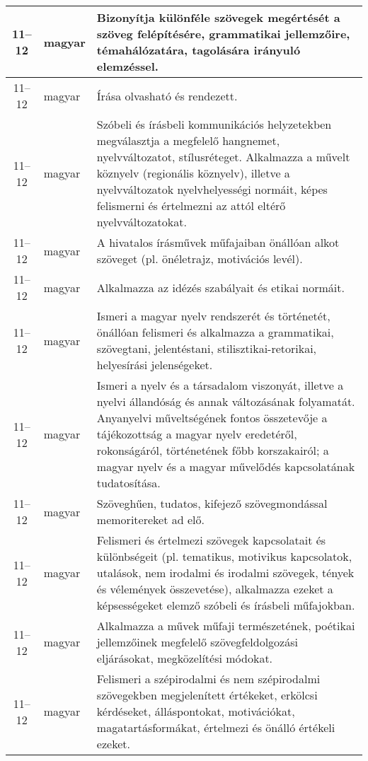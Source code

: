 \begin{small}
\begin{longtable}{c | p{2cm} |  p{11cm} }
              11--12 & magyar & Bizonyítja különféle szövegek megértését a szöveg felépítésére, grammatikai jellemzőire, témahálózatára, tagolására irányuló elemzéssel. \\ \hline
              11--12 & magyar & Írása olvasható és rendezett. \\ \hline
              11--12 & magyar & Szóbeli és írásbeli kommunikációs helyzetekben megválasztja a megfelelő hangnemet, nyelvváltozatot, stílusréteget. Alkalmazza a művelt köznyelv (regionális köznyelv), illetve a nyelvváltozatok nyelvhelyességi normáit, képes felismerni és értelmezni az attól eltérő nyelvváltozatokat. \\ \hline
              11--12 & magyar & A hivatalos írásművek műfajaiban önállóan alkot szöveget (pl. önéletrajz, motivációs levél). \\ \hline
              11--12 & magyar & Alkalmazza az idézés szabályait és etikai normáit. \\ \hline
              11--12 & magyar & Ismeri a magyar nyelv rendszerét és történetét, önállóan felismeri és alkalmazza a grammatikai, szövegtani, jelentéstani, stilisztikai-retorikai, helyesírási jelenségeket. \\ \hline
              11--12 & magyar & Ismeri a nyelv és a társadalom viszonyát, illetve a nyelvi állandóság és annak változásának folyamatát. Anyanyelvi műveltségének fontos összetevője a tájékozottság a magyar nyelv eredetéről, rokonságáról, történetének főbb korszakairól; a magyar nyelv és a magyar művelődés kapcsolatának tudatosítása. \\ \hline
              11--12 & magyar & Szöveghűen, tudatos, kifejező szövegmondással memoritereket ad elő. \\ \hline
              11--12 & magyar & Felismeri és értelmezi szövegek kapcsolatait és különbségeit (pl. tematikus, motivikus kapcsolatok, utalások, nem irodalmi és irodalmi szövegek, tények és vélemények összevetése), alkalmazza ezeket a képsességeket elemző szóbeli és írásbeli műfajokban. \\ \hline
              11--12 & magyar & Alkalmazza a művek műfaji természetének, poétikai jellemzőinek megfelelő szövegfeldolgozási eljárásokat, megközelítési módokat. \\ \hline
              11--12 & magyar & Felismeri a szépirodalmi és nem szépirodalmi szövegekben megjelenített értékeket, erkölcsi kérdéseket, álláspontokat, motivációkat, magatartásformákat, értelmezi és önálló értékeli ezeket. \\ \hline

\end{longtable}
\end{small}
